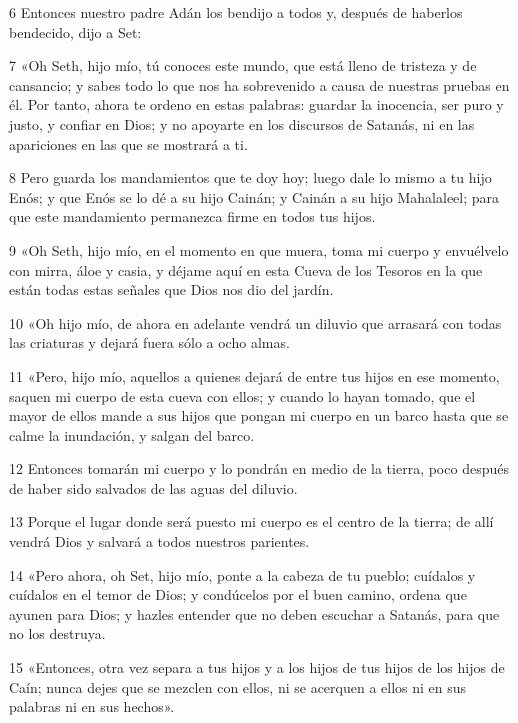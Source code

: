 \par 6 Entonces nuestro padre Adán los bendijo a todos y, después de haberlos bendecido, dijo a Set:

\par 7 «Oh Seth, hijo mío, tú conoces este mundo, que está lleno de tristeza y de cansancio; y sabes todo lo que nos ha sobrevenido a causa de nuestras pruebas en él. Por tanto, ahora te ordeno en estas palabras: guardar la inocencia, ser puro y justo, y confiar en Dios; y no apoyarte en los discursos de Satanás, ni en las apariciones en las que se mostrará a ti.

\par 8 Pero guarda los mandamientos que te doy hoy; luego dale lo mismo a tu hijo Enós; y que Enós se lo dé a su hijo Cainán; y Cainán a su hijo Mahalaleel; para que este mandamiento permanezca firme en todos tus hijos.

\par 9 «Oh Seth, hijo mío, en el momento en que muera, toma mi cuerpo y envuélvelo con mirra, áloe y casia, y déjame aquí en esta Cueva de los Tesoros en la que están todas estas señales que Dios nos dio del jardín.

\par 10 «Oh hijo mío, de ahora en adelante vendrá un diluvio que arrasará con todas las criaturas y dejará fuera sólo a ocho almas.

\par 11 «Pero, hijo mío, aquellos a quienes dejará de entre tus hijos en ese momento, saquen mi cuerpo de esta cueva con ellos; y cuando lo hayan tomado, que el mayor de ellos mande a sus hijos que pongan mi cuerpo en un barco hasta que se calme la inundación, y salgan del barco.

\par 12 Entonces tomarán mi cuerpo y lo pondrán en medio de la tierra, poco después de haber sido salvados de las aguas del diluvio.

\par 13 Porque el lugar donde será puesto mi cuerpo es el centro de la tierra; de allí vendrá Dios y salvará a todos nuestros parientes.

\par 14 «Pero ahora, oh Set, hijo mío, ponte a la cabeza de tu pueblo; cuídalos y cuídalos en el temor de Dios; y condúcelos por el buen camino, ordena que ayunen para Dios; y hazles entender que no deben escuchar a Satanás, para que no los destruya.

\par 15 «Entonces, otra vez separa a tus hijos y a los hijos de tus hijos de los hijos de Caín; nunca dejes que se mezclen con ellos, ni se acerquen a ellos ni en sus palabras ni en sus hechos».

